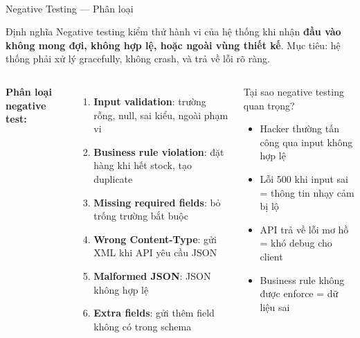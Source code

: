 \documentclass[aspectratio=169,10pt]{beamer}
\newcommand{\sref}[1]{\textsuperscript{\scriptsize\cite{#1}}}
\begin{document}
\begin{frame}{Negative Testing --- Phân loại\sref{istqb}}
  \begin{block}{Định nghĩa}
    Negative testing kiểm thử hành vi của hệ thống khi nhận
    \textbf{đầu vào không mong đợi, không hợp lệ, hoặc ngoài
    vùng thiết kế}. Mục tiêu: hệ thống phải xử lý gracefully,
    không crash, và trả về lỗi rõ ràng.
  \end{block}

  \vspace{0.4em}
  \begin{columns}
    \textbf{Phân loại negative test:}
    \begin{enumerate}
      \item \textbf{Input validation}: trường rỗng, null,
            sai kiểu, ngoài phạm vi
      \item \textbf{Business rule violation}: đặt hàng
            khi hết stock, tạo duplicate
      \item \textbf{Missing required fields}: bỏ trống
            trường bắt buộc
      \item \textbf{Wrong Content-Type}: gửi XML khi API
            yêu cầu JSON
      \item \textbf{Malformed JSON}: JSON không hợp lệ
      \item \textbf{Extra fields}: gửi thêm field không
            có trong schema
    \end{enumerate}

    \begin{alertblock}{Tại sao negative testing quan trọng?}
      \begin{itemize}
        \item Hacker thường tấn công qua input không hợp lệ
        \item Lỗi 500 khi input sai = thông tin nhạy cảm bị lộ
        \item API trả về lỗi mơ hồ = khó debug cho client
        \item Business rule không được enforce = dữ liệu sai
      \end{itemize}
    \end{alertblock}
  \end{columns}
\end{frame}
\end{document}
